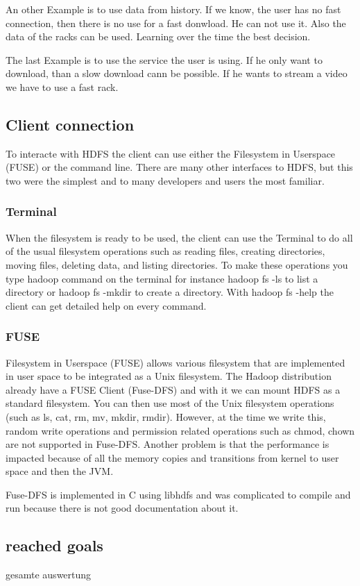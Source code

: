 An other Example is to use data from history. If we know, the user has no fast connection, then there is no use for a fast donwload. He can not use it. Also the data of the racks can be used. Learning over the time the best decision.

The last Example is to use the service the user is using. If he only want to download, than a slow download cann be possible. If he wants to stream a video we have to use a fast rack.

\subsection{Client connection}

To interacte with HDFS the client can use either the Filesystem in Userspace (FUSE) or the command line. There are many other interfaces to HDFS, but this two were the simplest and to many developers and users the most familiar.

\label{sec:hdfs_client}
\subsubsection{Terminal}

When the filesystem is ready to be used, the client can use the Terminal to do all of the usual filesystem operations such as reading files, creating directories, moving files, deleting data, and listing directories. To make these operations you type hadoop command on the terminal for instance hadoop fs -ls to list a directory or hadoop fs -mkdir to create a directory. With hadoop fs -help the client can get detailed help on every command.
\subsubsection{FUSE}

Filesystem in Userspace (FUSE) allows various filesystem that are implemented in user space to be integrated as a Unix filesystem. The Hadoop distribution already have a FUSE Client (Fuse-DFS) and with it we can mount HDFS as a standard filesystem. You can then use most of the Unix filesystem operations (such as ls, cat, rm, mv, mkdir, rmdir). However, at the time we write this, random write operations and permission related operations such as chmod, chown are not supported in Fuse-DFS. Another problem is that the performance is impacted because of all the memory copies and transitions from kernel to user space and then the JVM.

Fuse-DFS is implemented in C using libhdfs and was complicated to compile and run because there is not good documentation about it.
\subsection{reached goals}
gesamte auswertung





